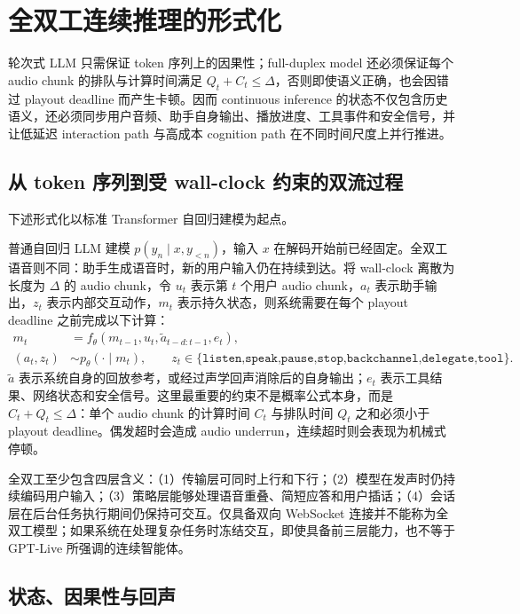 \section{全双工连续推理的形式化}

轮次式 LLM 只需保证 token 序列上的因果性；full-duplex model 还必须保证每个 audio chunk 的排队与计算时间满足 $Q_t+C_t\leq\Delta$，否则即使语义正确，也会因错过 playout deadline 而产生卡顿。因而 continuous inference 的状态不仅包含历史语义，还必须同步用户音频、助手自身输出、播放进度、工具事件和安全信号，并让低延迟 interaction path 与高成本 cognition path 在不同时间尺度上并行推进。

\subsection{从 token 序列到受 wall-clock 约束的双流过程}

下述形式化以标准 Transformer 自回归建模为起点\cite{vaswani2017attention}。

普通自回归 LLM 建模 $p(y_n\mid x,y_{<n})$，输入 $x$ 在解码开始前已经固定。全双工语音则不同：助手生成语音时，新的用户输入仍在持续到达。将 wall-clock 离散为长度为 $\Delta$ 的 audio chunk，令 $u_t$ 表示第 $t$ 个用户 audio chunk，$a_t$ 表示助手输出，$z_t$ 表示内部交互动作，$m_t$ 表示持久状态，则系统需要在每个 playout deadline 之前完成以下计算：
\begin{align}
m_t &= f_\theta(m_{t-1},u_t,\tilde a_{t-d:t-1},e_t),\\
(a_t,z_t) &\sim p_\theta(\cdot\mid m_t),\qquad
z_t\in\{\texttt{listen,speak,pause,stop,backchannel,delegate,tool}\}.
\end{align}
$\tilde a$ 表示系统自身的回放参考，或经过声学回声消除后的自身输出；$e_t$ 表示工具结果、网络状态和安全信号。这里最重要的约束不是概率公式本身，而是 $C_t+Q_t\leq\Delta$：单个 audio chunk 的计算时间 $C_t$ 与排队时间 $Q_t$ 之和必须小于 playout deadline。偶发超时会造成 audio underrun，连续超时则会表现为机械式停顿。

全双工至少包含四层含义：（1）传输层可同时上行和下行；（2）模型在发声时仍持续编码用户输入；（3）策略层能够处理语音重叠、简短应答和用户插话；（4）会话层在后台任务执行期间仍保持可交互。仅具备双向 WebSocket 连接并不能称为全双工模型；如果系统在处理复杂任务时冻结交互，即使具备前三层能力，也不等于 GPT-Live 所强调的连续智能体。

\subsection{状态、因果性与回声}

